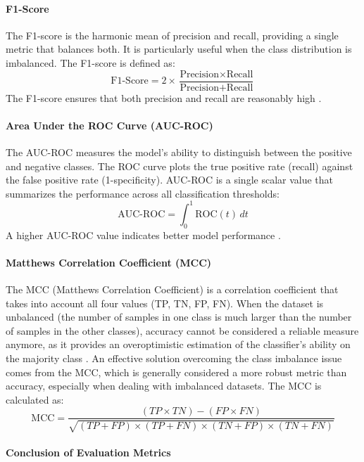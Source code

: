 \paragraph{F1-Score}
The F1-score is the harmonic mean of precision and recall, providing a single metric that balances both. It is particularly useful when the class distribution is imbalanced. The F1-score is defined as:
\[
\text{F1-Score} = 2 \times \frac{\text{Precision} \times \text{Recall}}{\text{Precision} + \text{Recall}}
\]
The F1-score ensures that both precision and recall are reasonably high \cite{powers2011evaluation}.

\paragraph{Area Under the ROC Curve (AUC-ROC)}
The AUC-ROC measures the model's ability to distinguish between the positive and negative classes. The ROC curve plots the true positive rate (recall) against the false positive rate (1-specificity). AUC-ROC is a single scalar value that summarizes the performance across all classification thresholds:
\[
\text{AUC-ROC} = \int_{0}^{1} \text{ROC}(t) \, dt
\]
A higher AUC-ROC value indicates better model performance \cite{bradley1997use}.

\paragraph{Matthews Correlation Coefficient (MCC)}
The MCC (Matthews Correlation Coefficient) is a correlation coefficient that takes into account all four values (TP, TN, FP, FN). When the dataset is unbalanced (the number of samples in one class is much larger than the number of samples in the other classes), accuracy cannot be considered a reliable measure anymore, as it provides an overoptimistic estimation of the classifier's ability on the majority class \cite{chicco2020advantages}. An effective solution overcoming the class imbalance issue comes from the MCC, which is generally considered a more robust metric than accuracy, especially when dealing with imbalanced datasets. The MCC is calculated as:
\[
\text{MCC} = \frac{(TP \times TN) - (FP \times FN)}{\sqrt{(TP + FP) \times (TP + FN) \times (TN + FP) \times (TN + FN)}}
\]

\paragraph{Conclusion of Evaluation Metrics}


